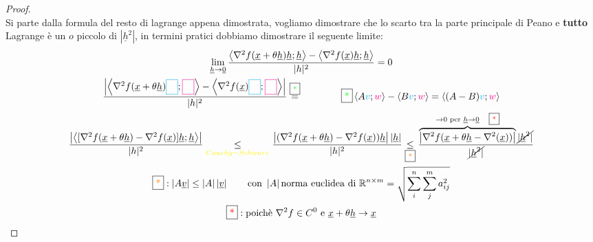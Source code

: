 \documentclass[a4paper, oneside]{article}
\begin{document}
        \begin{proof}\hfill\\
            Si parte dalla formula del resto di lagrange appena dimostrata, vogliamo dimostrare che lo scarto tra la parte principale di Peano e \textbf{tutto} Lagrange è un $o$ piccolo di $|\underline{h}^2|$, in termini pratici dobbiamo dimostrare il seguente limite:            
            \begin{gather*}
                \lim_{\underline{h} \to \underline{0}} \frac{\left\langle \nabla^2f(\underline{x} + \theta \underline{h})\underline{h} ; \underline{h} \right\rangle - \left\langle \nabla^2f(\underline{x})\underline{h} ; \underline{h} \right\rangle }{|h|^2} = 0\\
                \frac{\left\lvert \left\langle \nabla^2f(\underline{x} + \theta \underline{h}) \textcolor{cyan}{\fbox{\textcolor{white}{\underline{h}}}} ; \textcolor{magenta}{\fbox{\textcolor{white}{\underline{h}}}} \right\rangle - \left\langle \nabla^2f(\underline{x})\textcolor{cyan}{\fbox{\textcolor{white}{\underline{h}}}} ; \textcolor{magenta}{\fbox{\textcolor{white}{\underline{h}}}} \right\rangle\right\rvert  }{|h|^2} \overset{\text{\fbox{\textcolor{green}{*}}}}{=} \qquad\qquad \text{\fbox{\textcolor{green}{*}}}\left\langle  A \textcolor{cyan}{v};\textcolor{magenta}{w}\right\rangle - \left\langle B \textcolor{cyan}{v};\textcolor{magenta}{w}\right\rangle = \left\langle (A-B)\textcolor{cyan}{v};\textcolor{magenta}{w}\right\rangle\\
                \frac{\left\lvert \left\langle [\nabla^2 f(\underline{x} + \theta \underline{h}) - \nabla^2 f(\underline{x})] \underline{h} ; \underline{h} \right\rangle \right\rvert }{|h|^2} \underset{\textcolor{yellow}{Cauchy-Schwarz}}{\leq} \frac{\left\lvert (\nabla^2 f(\underline{x} + \theta \underline{h}) - \nabla^2 f(\underline{x}))  \underline{h} \right\rvert \left\lvert \underline{h}\right\rvert }{|h|^2} \underset{\text{\fbox{\textcolor{orange}{*}}}}{\leq} \frac{\overbrace{\left\lvert \nabla^2f(\underline{x}+ \theta \underline{h} - \nabla^2(\underline{x}))\right\rvert}^{\to 0 \text{ per } \underline{h} \to \underline{0} \quad \text{\fbox{\textcolor{red}{*}}}} \cancel{|\underline{h}^2|}}{\cancel{|\underline{h}^2|}}\\
                \text{\fbox{\textcolor{orange}{*}}}: \left\lvert A \underline{v} \right\rvert \leq \left\lvert A \right\rvert \left\lvert \underline{v} \right\rvert \qquad \text{con }\left\lvert A \right\rvert \text{norma euclidea di }\mathbb{R}^{n\times m} =\sqrt{\sum_{i}^{n}\sum_{j}^{m} a^2_{ij} }   \\
                \text{\fbox{\textcolor{red}{*}}}: \text{poichè } \nabla^2f\in C^0 \text{ e } \underline{x} + \theta\underline{h} \to \underline{x}
            \end{gather*}
        \end{proof}
\end{document}
